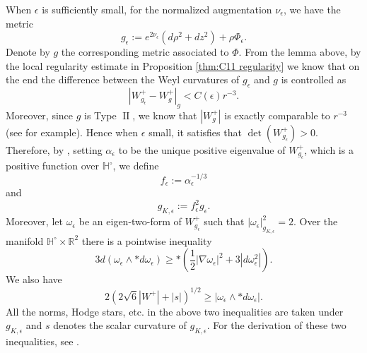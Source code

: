 \documentclass[a4paper,11pt]{amsart}
\theoremstyle{definition}
\numberwithin{equation}{section}
\DeclareMathOperator{\II}{II}
\begin{document}
When $\epsilon$ is sufficiently small, for the normalized augmentation $\nu_\epsilon$, we have  the metric $$g_\epsilon:=e^{2\nu_\epsilon}(d\rho^2+dz^2)+\rho \Phi_\epsilon.$$  
Denote by $g$ the corresponding metric associated to $\Phi$. From the lemma above, by the local regularity estimate in Proposition \ref{thm:C11 regularity} we know that on the end the difference between the Weyl curvatures of $g_{\epsilon}$ and $g$ is controlled as $$|W^+_{g_\epsilon}-W^+_g|_g<C(\epsilon) r^{-3}.$$ Moreover, since $g$ is Type $\II$, we know that $|W^+_g|$ is exactly comparable to $r^{-3}$ (see \cite{BG} for example). Hence when $\epsilon$ small, it satisfies that $\det(W^+_{g_\epsilon})>0$. Therefore, by \cite{BGL}, setting $\alpha_{\epsilon}$ to be the unique positive eigenvalue of $W^+_{g_\epsilon}$, which is a positive function over $\mathbb{H}^\circ$, we define $$f_{\epsilon}:=\alpha_{\epsilon}^{-1/3}$$ and $$g_{K,\epsilon}:=f_{\epsilon}^2g_{\epsilon}.$$ Moreover, let $\omega_\epsilon$ be an eigen-two-form of $W^+_{g_\epsilon}$ such that $|\omega_\epsilon|^2_{g_{K,\epsilon}}=2$. Over the manifold $\mathbb{H}^\circ\times\mathbb{R}^2$ there is a pointwise inequality
\begin{equation}\label{eq:pointwise 1}
    3d(\omega_{\epsilon}\wedge *d\omega_{\epsilon})\geq *(\frac{1}{2}|\nabla\omega_\epsilon|^2+3|d\omega_{\epsilon}^2|).
\end{equation}
We also have
\begin{equation}\label{eq:pointwise 2}
    2(2\sqrt{6}|W^+|+|s|)^{1/2}\geq|\omega_{\epsilon}\wedge *d\omega_{\epsilon}|.
\end{equation}
All the norms, Hodge stars, etc. in the above two inequalities are taken under $g_{K,\epsilon}$ and $s$ denotes the scalar curvature of $g_{K,\epsilon}$. For the derivation of these two inequalities, see \cite{BGL}.
\end{document}

